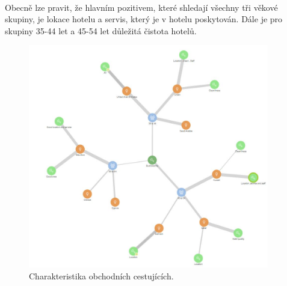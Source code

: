 \documentclass[czech,BP]{thesiskiv}
\begin{document}
\\
Obecně lze pravit, že hlavním pozitivem, které shledají všechny tři věkové skupiny, je lokace hotelu a servis, který je v hotelu poskytován. Dále je pro skupiny 35-44 let a 45-54 let důležitá čistota hotelů.
\begin{figure}[htbp]
	\centering
	\includegraphics[width = 10.5cm]{img/Business_trip_customers_proportions.jpg}
	\caption{Charakteristika obchodních cestujících.}
	\label{fig:Business}	
\end{figure}
\end{document}
